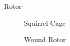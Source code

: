 \documentclass{beamer}
\begin{document}
\begin{frame}{Rotor}
  \begin{minipage}{0.48\textwidth}
    \centering
    \begin{figure}
      \caption{Squirrel Cage}
    \end{figure}
  \end{minipage}\hfill
  \begin{minipage}{0.48\textwidth}
    \centering
    \begin{figure}
      \caption{Wound Rotor}
    \end{figure}
  \end{minipage}
\end{frame}
\end{document}
